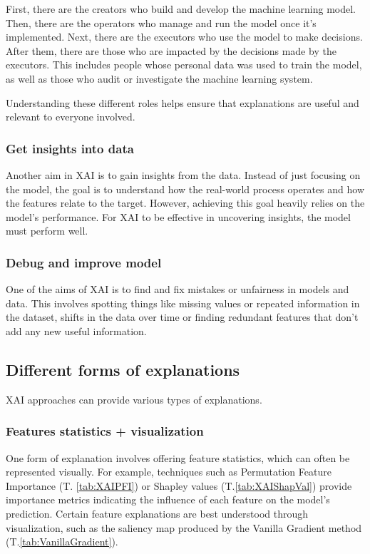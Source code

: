 First, there are the creators who build and develop the machine learning model. Then, there are the operators who manage and run the model once it's implemented. Next, there are the executors who use the model to make decisions. After them, there are those who are impacted by the decisions made by the executors. This includes people whose personal data was used to train the model, as well as those who audit or investigate the machine learning system.

Understanding these different roles helps ensure that explanations are useful and relevant to everyone involved.

\subsubsection*{Get insights into data}
Another aim in XAI is to gain insights from the data. Instead of just focusing on the model, the goal is to understand how the real-world process operates and how the features relate to the target. 
However, achieving this goal heavily relies on the model's performance. For XAI to be effective in uncovering insights, the model must perform well.\cite{freiesleben2022scientific}

\subsubsection*{Debug and improve model}
One of the aims of XAI is to find and fix mistakes or unfairness in models and data. This involves spotting things like missing values or repeated information in the dataset, shifts in the data over time or finding redundant features that don't add any new useful information.\cite{hassija2024interpreting,InterpretableToWhom}

\subsection{Different forms of explanations}

XAI approaches can provide various types of explanations.

\subsubsection*{Features statistics + visualization}
One form of explanation involves offering feature statistics, which can often be represented visually. For example, techniques such as Permutation Feature Importance (T. \ref{tab:XAIPFI}) or Shapley values (T.\ref{tab:XAIShapVal}) provide importance metrics indicating the influence of each feature on the model's prediction. Certain feature explanations are best understood through visualization, such as the saliency map produced by the Vanilla Gradient method (T.\ref{tab:VanillaGradient}).

